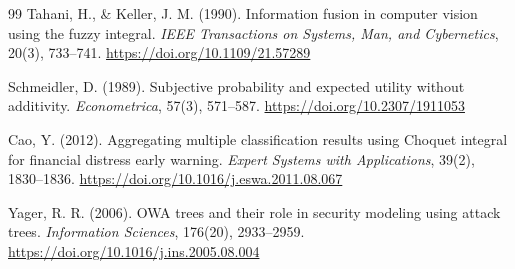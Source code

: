\documentclass[reqno,11pt]{amsart}
\theoremstyle{definition}
\theoremstyle{plain}
\theoremstyle{remark}
\begin{document}
\begin{thebibliography}{99}
Tahani, H., \& Keller, J. M. (1990).
Information fusion in computer vision using the fuzzy integral.
\emph{IEEE Transactions on Systems, Man, and Cybernetics}, 20(3),
733--741.
\url{https://doi.org/10.1109/21.57289}

Schmeidler, D. (1989).
Subjective probability and expected utility without additivity.
\emph{Econometrica}, 57(3), 571--587.
\url{https://doi.org/10.2307/1911053}

Cao, Y. (2012).
Aggregating multiple classification results using Choquet integral for
financial distress early warning.
\emph{Expert Systems with Applications}, 39(2), 1830--1836.
\url{https://doi.org/10.1016/j.eswa.2011.08.067}

Yager, R. R. (2006).
OWA trees and their role in security modeling using attack trees.
\emph{Information Sciences}, 176(20), 2933--2959.
\url{https://doi.org/10.1016/j.ins.2005.08.004}




\end{thebibliography}
\end{document}
